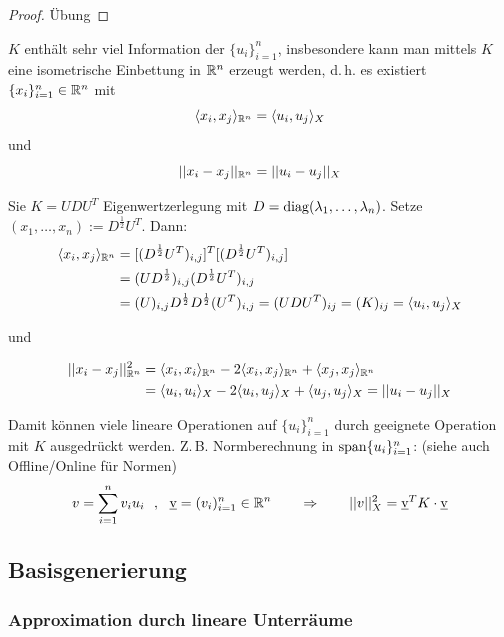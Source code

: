 \begin{proof}
	Übung
\end{proof}

\begin{bem}
$K$ enthält sehr viel Information der $\{u_i\}_{i=1}^n$, insbesondere kann man mittels $K$ eine isometrische Einbettung in $\mathbb{R}^n$ erzeugt werden, d.\,h. es existiert $\{x_i\}_{i=1}^n \in \mathbb{R}^n$ mit 
\[
	\langle x_i, x_j \rangle_{\mathbb{R}^n} = \langle u_i, u_j \rangle_X
\] 
und 
\[
	||x_i - x_j ||_{\mathbb{R}^n} = ||u_i - u_j||_X
\]

Sie $K = UDU^T$ Eigenwertzerlegung mit $D= \operatorname{diag}(\lambda_1,\dots,\lambda_n)$. Setze $(x_1,\dots,x_n):=D^{\frac{1}{2}}U^T$.
Dann:
\begin{align*}
	\langle x_i, x_j \rangle_{\mathbb{R}^n} &= [(D^{\frac{1}{2}}U^T)_{i,j}]^T[(D^{\frac{1}{2}}U^T)_{i,j}]  \\
	&= (UD^{\frac{1}{2}})_{i,j} (D^{\frac{1}{2}} U^T)_{i,j} \\
	&= (U)_{i,j} D^{\frac{1}{2}} D^{\frac{1}{2}} (U^T)_{i,j} = (UDU^T)_{ij} = (K)_{ij} =\langle u_i, u_j \rangle_X
\end{align*}

und

\begin{align*}
	||x_i-x_j||_{\mathbb{R}^n}^2 &= \langle x_i, x_i \rangle_{\mathbb{R}^n} - 2 \langle x_i, x_j \rangle_{\mathbb{R}^n} + \langle x_j, x_j \rangle_{\mathbb{R}^n} \\
	&= \langle u_i, u_i \rangle_{X} - 2 \langle u_i, u_j \rangle_{X} + \langle u_j, u_j \rangle_{X} = ||u_i-u_j||_X
\end{align*}

Damit können viele lineare Operationen auf $\{u_i\}_{i=1}^n$ durch geeignete Operation mit $K$ ausgedrückt werden. Z.\,B. Normberechnung in $\operatorname{span}\{u_i\}_{i=1}^n$: (siehe auch Offline/Online für Normen)
\[
	v= \sum\limits_{i=1}^n v_i u_i \,\,\,\, , \,\,\,\, \underbar v= (v_i)_{i=1}^n \in \mathbb{R}^n \qquad \Rightarrow \qquad ||v||_X^2 = \underbar v^T K \cdot \underbar v
\]

\end{bem}

\subsection{Basisgenerierung}
\label{sec-3.4}

\subsubsection*{Approximation durch lineare Unterräume}

